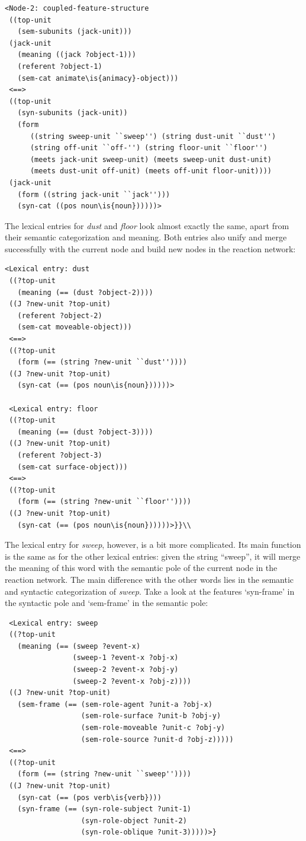 \ea
\begin{lstlisting}
<Node-2: coupled-feature-structure
 ((top-unit
   (sem-subunits (jack-unit)))
 (jack-unit
   (meaning ((jack ?object-1)))
   (referent ?object-1)
   (sem-cat animate\is{animacy}-object)))
 <==>
 ((top-unit
   (syn-subunits (jack-unit))
   (form 
      ((string sweep-unit ``sweep'') (string dust-unit ``dust'') 
      (string off-unit ``off-'') (string floor-unit ``floor'') 
      (meets jack-unit sweep-unit) (meets sweep-unit dust-unit) 
      (meets dust-unit off-unit) (meets off-unit floor-unit))))
 (jack-unit
   (form ((string jack-unit ``jack'')))
   (syn-cat ((pos noun\is{noun})))))> 
\end{lstlisting}
\z


The lexical entries for {\em dust} and {\em floor} look almost exactly the same, apart from their semantic categorization and meaning. Both entries also unify and merge successfully with the current node and build new nodes in the reaction network: 

\ea
\begin{lstlisting}
<Lexical entry: dust
 ((?top-unit
   (meaning (== (dust ?object-2))))
 ((J ?new-unit ?top-unit)
   (referent ?object-2)
   (sem-cat moveable-object)))
 <==>
 ((?top-unit
   (form (== (string ?new-unit ``dust''))))
 ((J ?new-unit ?top-unit)
   (syn-cat (== (pos noun\is{noun})))))> 
 
 <Lexical entry: floor
 ((?top-unit
   (meaning (== (dust ?object-3))))
 ((J ?new-unit ?top-unit)
   (referent ?object-3)
   (sem-cat surface-object)))
 <==>
 ((?top-unit
   (form (== (string ?new-unit ``floor''))))
 ((J ?new-unit ?top-unit)
   (syn-cat (== (pos noun\is{noun})))))>}}\\
\end{lstlisting}
\z


The lexical entry for {\em sweep}, however, is a bit more complicated. Its main function is the same as for the other lexical entries: given the string ``sweep'', it will merge the meaning of this word with the semantic pole of the current node in the reaction network. The main difference with the other words lies in the semantic and syntactic categorization of {\em sweep}. Take a look at the features `syn-frame' in the syntactic pole and `sem-frame' in the semantic pole:


\ea
\begin{lstlisting}
 <Lexical entry: sweep
 ((?top-unit
   (meaning (== (sweep ?event-x)
                (sweep-1 ?event-x ?obj-x)
                (sweep-2 ?event-x ?obj-y)
                (sweep-2 ?event-x ?obj-z))))
 ((J ?new-unit ?top-unit)
   (sem-frame (== (sem-role-agent ?unit-a ?obj-x)
                  (sem-role-surface ?unit-b ?obj-y)
                  (sem-role-moveable ?unit-c ?obj-y)
                  (sem-role-source ?unit-d ?obj-z)))))
 <==>
 ((?top-unit
   (form (== (string ?new-unit ``sweep''))))
 ((J ?new-unit ?top-unit)
   (syn-cat (== (pos verb\is{verb})))
   (syn-frame (== (syn-role-subject ?unit-1)
                  (syn-role-object ?unit-2)
                  (syn-role-oblique ?unit-3)))))>}
\end{lstlisting}
\z


